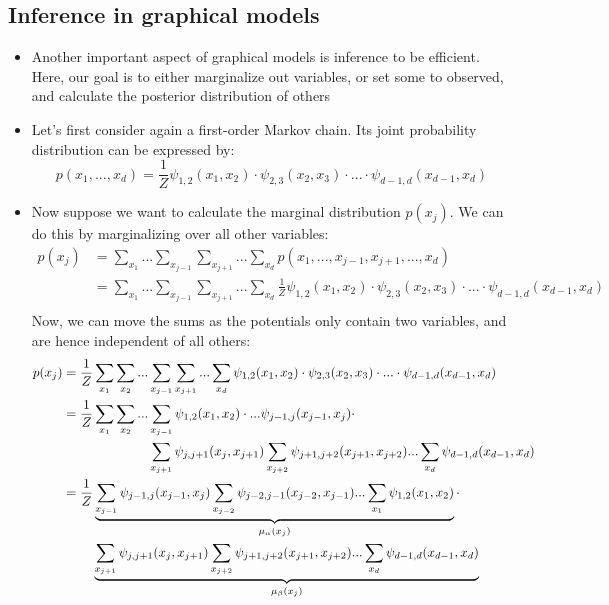 \subsection{Inference in graphical models}
\begin{itemize}
	\item Another important aspect of graphical models is inference to be efficient. Here, our goal is to either marginalize out variables, or set some to observed, and calculate the posterior distribution of others
	\item Let's first consider again a first-order Markov chain. Its joint probability distribution can be expressed by:
	$$p(x_1,...,x_d)=\frac{1}{Z}\psi_{1,2}(x_1,x_2)\cdot \psi_{2,3}(x_2,x_3)\cdot ... \cdot \psi_{d-1,d}(x_{d-1},x_d)$$
	\item Now suppose we want to calculate the marginal distribution $p(x_j)$. We can do this by marginalizing over all other variables:
	\begin{equation*}
		\begin{split}
			p(x_j) & = \sum_{x_1}...\sum_{x_{j-1}}\sum_{x_{j+1}}...\sum_{x_d} p(x_1,...,x_{j-1},x_{j+1},...,x_d)\\
			& = \sum_{x_1}...\sum_{x_{j-1}}\sum_{x_{j+1}}...\sum_{x_d} \frac{1}{Z}\psi_{1,2}(x_1,x_2)\cdot \psi_{2,3}(x_2,x_3)\cdot ... \cdot \psi_{d-1,d}(x_{d-1},x_d)\\
		\end{split}
	\end{equation*}
	Now, we can move the sums as the potentials only contain two variables, and are hence independent of all others:
	\begin{equation*}
		\begin{split}
		p(x_j) & = \frac{1}{Z} \sum_{x_1}\sum_{x_2}...\sum_{x_{j-1}}\sum_{x_{j+1}}...\sum_{x_d}  \psi_{1,2}(x_1,x_2)\cdot \psi_{2,3}(x_2,x_3)\cdot ... \cdot \psi_{d-1,d}(x_{d-1},x_d)\\
		& =  \frac{1}{Z}\sum_{x_1}\sum_{x_2}...\sum_{x_{j-1}} \psi_{1,2}(x_1,x_2)\cdot ...\psi_{j-1,j}(x_{j-1},x_j) \cdot \\&\hspace{23mm}\sum_{x_{j+1}} \psi_{j,j+1}(x_{j},x_{j+1}) \sum_{x_{j+2}} \psi_{j+1,j+2}(x_{j+1},x_{j+2}) ... \sum_{x_{d}} \psi_{d-1,d}(x_{d-1},x_d)\\
		& = \frac{1}{Z} \underbrace{\sum_{x_{j-1}} \psi_{j-1,j}(x_{j-1},x_{j}) \sum_{x_{j-2}} \psi_{j-2,j-1}(x_{j-2},x_{j-1}) ... \sum_{x_{1}} \psi_{1,2}(x_{1},x_2)}_{\mu_{\alpha}(x_j)} \cdot \\&\hspace{8mm}\underbrace{\sum_{x_{j+1}} \psi_{j,j+1}(x_{j},x_{j+1}) \sum_{x_{j+2}} \psi_{j+1,j+2}(x_{j+1},x_{j+2}) ... \sum_{x_{d}} \psi_{d-1,d}(x_{d-1},x_d)}_{\mu_{\beta}(x_j)}\\

\end{split}
\end{equation*}
\end{itemize}
